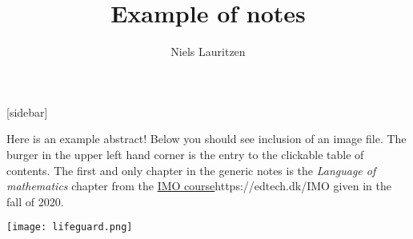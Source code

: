 \documentclass{article}
\title{Example of notes}
\author{Niels Lauritzen}
\begin{document}
[sidebar]

\maketitle

\vspace{2cm}

\begin{changemargin}{3cm}{3cm}
  Here is an example abstract! Below you should see inclusion of
  an image file. The burger in the upper left hand corner is the entry
  to the clickable table of contents. The first and only chapter in the generic notes is the \emph{Language of mathematics} chapter from  the \url{IMO course}{https://edtech.dk/IMO} given in the fall of 2020.
\end{changemargin}



\texttt{[image: lifeguard.png]}
\end{document}
